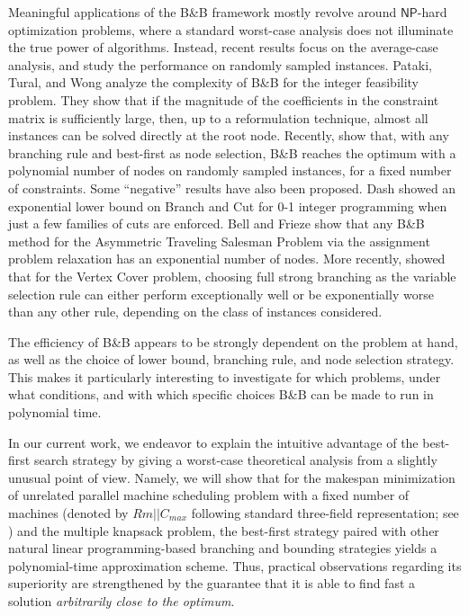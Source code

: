 \documentclass[a4paper,UKenglish,cleveref, autoref, thm-restate, pdfa]{lipics-v2021}
\theoremstyle{plain}
\begin{document}
Meaningful applications of the B\&B framework mostly revolve around $\mathsf{NP}$-hard optimization problems, where a standard worst-case analysis does not illuminate the true power of algorithms. Instead, recent results focus on the average-case analysis, and study the performance on randomly sampled instances. Pataki, Tural, and Wong \cite{pataki_basis_2010} analyze the complexity of B\&B for the integer feasibility problem. They show that if the magnitude of the coefficients in the constraint matrix is sufficiently large, then, up to a reformulation technique, almost all instances can be solved directly at the root node. Recently, \cite{dey_branch-and-bound_2023} show that, with any branching rule and best-first as node selection, B\&B reaches the optimum with a polynomial number of nodes on randomly sampled instances, for a fixed number of constraints.
Some ``negative'' results have also been proposed. Dash \cite{dash_exponential_2005} showed an exponential lower bound on Branch and Cut for 0-1 integer programming when just a few families of cuts are enforced. Bell and Frieze \cite{bell_solving_2023} show that any B\&B method for the Asymmetric Traveling Salesman Problem via the assignment problem relaxation has an exponential number of nodes.
More recently, \cite{full_strong_branching} showed that for the Vertex Cover problem, choosing full strong branching as the variable selection rule can either perform exceptionally well or be exponentially worse than any other rule, depending on the class of instances considered.


The efficiency of B\&B appears to be strongly dependent on the problem at hand, as well as the choice of lower bound, branching rule, and node selection strategy. This makes it particularly interesting to investigate for which problems, under what conditions, and with which specific choices B\&B can be made to run in polynomial time.

In our current work, we endeavor to explain the intuitive advantage of the best-first search strategy by giving a worst-case theoretical analysis from a slightly unusual point of view. Namely, we will show that for the makespan minimization of unrelated parallel machine scheduling problem with a fixed number of machines (denoted by $Rm||C_{max}$ following standard three-field representation; see \cite{machine_scheduling_review}) and the multiple knapsack problem, the best-first strategy paired with other natural linear programming-based branching and bounding strategies yields a polynomial-time approximation scheme. Thus, practical observations regarding its superiority are strengthened by the guarantee that it is able to find fast a solution \emph{arbitrarily close to the optimum}.
\end{document}
